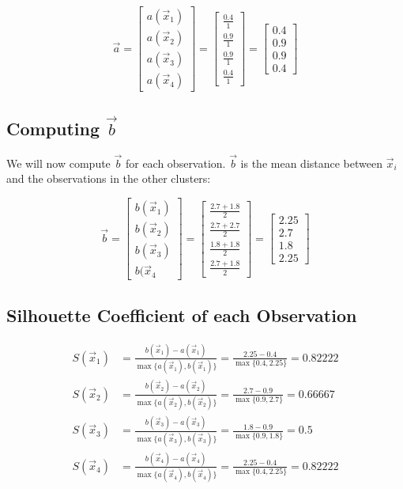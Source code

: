 \documentclass{article}
\begin{document}
\[ \vec{a} = \begin{bmatrix} a(\vec{x}_1) \\ a(\vec{x}_2) \\ a(\vec{x}_3) \\ a(\vec{x}_4) \end{bmatrix} = \begin{bmatrix} \frac{0.4}{1} \\ \frac{0.9}{1} \\ \frac{0.9}{1} \\ \frac{0.4}{1} \end{bmatrix} = \begin{bmatrix} 0.4 \\ 0.9 \\ 0.9 \\ 0.4 \end{bmatrix} \]

\subsection*{Computing $\vec{b}$}

We will now compute $\vec{b}$ for each observation. $\vec{b}$ is the mean distance between $\vec{x}_i$ and the observations in the other clusters:

\[ \vec{b} = \begin{bmatrix} b(\vec{x}_1) \\ b(\vec{x}_2) \\ b(\vec{x}_3) \\ b(\vec{x}_4 \end{bmatrix} = \begin{bmatrix} \frac{2.7+1.8}{2} \\ \frac{2.7+2.7}{2} \\ \frac{1.8+1.8}{2} \\ \frac{2.7+1.8}{2} \end{bmatrix} = \begin{bmatrix} 2.25 \\ 2.7 \\ 1.8 \\ 2.25 \end{bmatrix} \]

\subsection*{Silhouette Coefficient of each Observation}

\begin{align*}
  S(\vec{x}_1) &= \frac{b(\vec{x}_1) - a(\vec{x}_1)}{\max \{ a(\vec{x}_1), b(\vec{x}_1) \}} = \frac{2.25 - 0.4}{\max \{ 0.4, 2.25 \}} = 0.82222 \\
  S(\vec{x}_2) &= \frac{b(\vec{x}_2) - a(\vec{x}_2)}{\max \{ a(\vec{x}_2), b(\vec{x}_2) \}} = \frac{2.7 - 0.9}{\max \{ 0.9, 2.7 \}} = 0.66667 \\
  S(\vec{x}_3) &= \frac{b(\vec{x}_3) - a(\vec{x}_3)}{\max \{ a(\vec{x}_3), b(\vec{x}_3) \}} = \frac{1.8 - 0.9}{\max \{ 0.9, 1.8 \}} = 0.5 \\
  S(\vec{x}_4) &= \frac{b(\vec{x}_4) - a(\vec{x}_4)}{\max \{ a(\vec{x}_4), b(\vec{x}_4) \}} = \frac{2.25 - 0.4}{\max \{ 0.4, 2.25 \}} = 0.82222
\end{align*}
\end{document}
